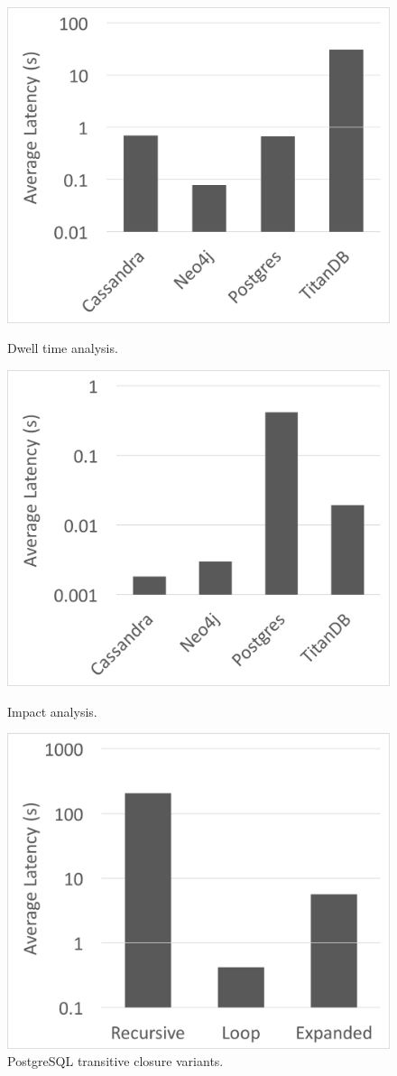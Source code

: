 \documentclass{cidr-2017}
\begin{document}
\begin{figure}
\centering
\begin{minipage}{.5\linewidth}
  \centering
  \includegraphics[width=\linewidth]{adjacent.png}
  \caption{Dwell time analysis.}
  \label{fig:dwell}
\end{minipage}%
\begin{minipage}{.5\linewidth}
  \centering
  \includegraphics[width=\linewidth]{trans_closure.png}
  \caption{Impact analysis.}
  \label{fig:impact}
  \end{minipage}
 \includegraphics[width=0.5\linewidth]{postgres.png}
  \caption{PostgreSQL transitive closure variants.}
  \label{fig:postgres}
\end{figure}
\end{document}
